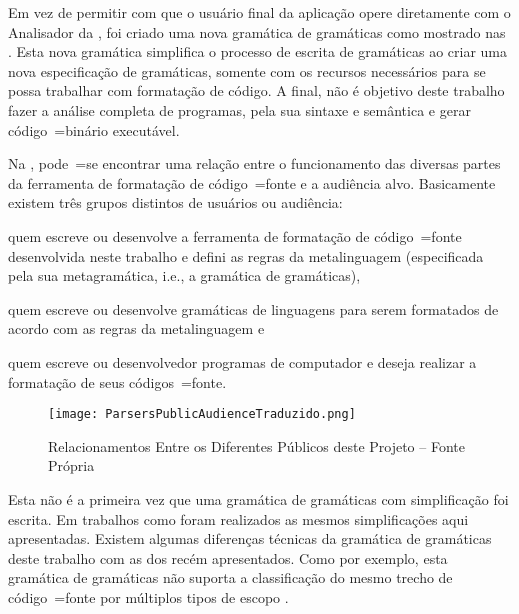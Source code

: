 Em vez de permitir com que o usuário final da aplicação opere diretamente com o Analisador da ,
foi criado uma nova gramática de gramáticas como mostrado nas .
Esta nova gramática simplifica o processo de escrita de gramáticas ao criar uma nova especificação de gramáticas,
somente com os recursos necessários para se possa trabalhar com formatação de código.
A final,
não é objetivo deste trabalho fazer a análise completa de programas,
pela sua sintaxe e
semântica e
gerar código~=binário executável.

Na ,
pode~=se encontrar uma relação entre o funcionamento das diversas partes da ferramenta de formatação de código~=fonte e
a audiência alvo.
Basicamente existem três grupos distintos de usuários ou
audiência:
\begin{inparaenum}[1)]
\item quem escreve ou
desenvolve a ferramenta de formatação de código~=fonte desenvolvida neste trabalho e
defini as regras da metalinguagem (especificada pela sua metagramática,
i.e.,
a gramática de gramáticas),
\item quem escreve ou
desenvolve gramáticas de linguagens para serem formatados de acordo com as regras da metalinguagem e
\item quem escreve ou
desenvolvedor programas de computador e
deseja realizar a formatação de seus códigos~=fonte.
\end{inparaenum}%
\begin{figure}[h]
\centering
\texttt{[image: ParsersPublicAudienceTraduzido.png]}
\caption[Relacionamentos entre os Diferentes Públicos deste Projeto]{Relacionamentos Entre os Diferentes Públicos deste Projeto -- Fonte Própria \cite{larkErrorRecovery}}
\label{ParsersPublicAudienceTraduzido}
\end{figure}

Esta não é a primeira vez que uma gramática de gramáticas com simplificação foi escrita.
Em trabalhos como  foram realizados as mesmos simplificações aqui apresentadas.
Existem algumas diferenças técnicas da gramática de gramáticas deste trabalho com as dos recém apresentados.
Como por exemplo,
esta gramática de gramáticas não suporta a classificação do mesmo trecho de código~=fonte por múltiplos tipos de escopo \cite{vsCodeSyntaxHighlighthing}.

